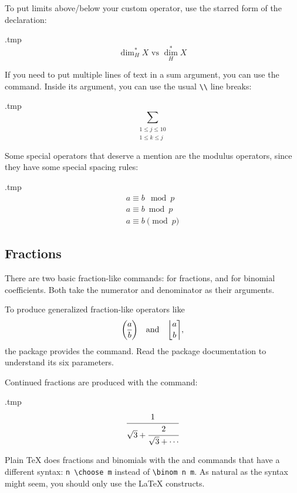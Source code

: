 To put limits above/below your custom operator, use the starred form of the declaration:
%
\begin{VerbatimOut}{\jobname.tmp}
\[
\operatorname{dim}_H^\ast X
\text{ vs }
\operatorname*{dim}_H^\ast X
\]
\end{VerbatimOut}
\ShowExample

If you need to put multiple lines of text in a sum argument,
you can use the  command.
Inside its argument, you can use the usual \verb|\\| line breaks:
%
\begin{VerbatimOut}{\jobname.tmp}
\[
\sum_{\substack{1 \leq j \leq 10\\ 1 \leq k \leq j}}
\]
\end{VerbatimOut}
\ShowExample


Some special operators that deserve a mention are the modulus operators,
since they have some special spacing rules:
%
\begin{VerbatimOut}{\jobname.tmp}
\begin{gather*}
a \equiv b \mod p\\
a \equiv b \bmod p\\
a \equiv b \pmod p
\end{gather*}
\end{VerbatimOut}
\ShowExample


%
%
\subsection{Fractions}
There are two basic fraction-like commands:  for fractions,
and  for binomial coefficients.
Both take the numerator and denominator as their arguments.

To produce generalized fraction-like operators like
\[
\genfrac{(}{)}{}{}{a}{b}
\quad\text{and}\quad
\genfrac{\lfloor}{\rceil}{0pt}{}{a}{b},
\]
the  package provides the  command.
Read the package documentation to understand its six parameters.

Continued fractions are produced with the  command:
%
\begin{VerbatimOut}{\jobname.tmp}
\[
\cfrac{1}{\sqrt 3 + \cfrac{2}{\sqrt 3 + \dotsb}}
\]
\end{VerbatimOut}
\ShowExample

\begin{warning}
Plain \TeX{} does fractions and binomials with the  and  commands
that have a different syntax: \verb|n \choose m| instead of \verb|\binom n m|.
As natural as the syntax might seem, you should only use the \LaTeX{} constructs.
\end{warning}


